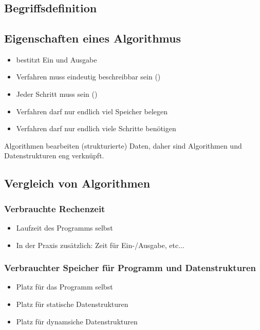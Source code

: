 \section{}
\subsection{Begriffsdefinition}


\subsection{Eigenschaften eines Algorithmus}
\begin{itemize}
    \item bestitzt Ein und Ausgabe
    \item Verfahren muss eindeutig beschreibbar sein ()
    \item Jeder Schritt muss  sein ()
    \item Verfahren darf nur endlich viel Speicher belegen
    \item Verfahren darf nur endlich viele Schritte benötigen
\end{itemize}
Algorithmen bearbeiten (strukturierte) Daten, daher sind Algorithmen und Datenstrukturen eng verknüpft.

\subsection{Vergleich von Algorithmen}
\subsubsection{Verbrauchte Rechenzeit}
\begin{itemize}
    \item Laufzeit des Programms selbst
    \item In der Praxis zusätzlich: Zeit für Ein-/Ausgabe, etc...
\end{itemize}
\subsubsection{Verbrauchter Speicher für Programm und Datenstrukturen}
\begin{itemize}
    \item Platz für das Programm selbst
    \item Platz für statische Datenstrukturen
    \item Platz für dynamsiche Datenstrukturen
\end{itemize}

